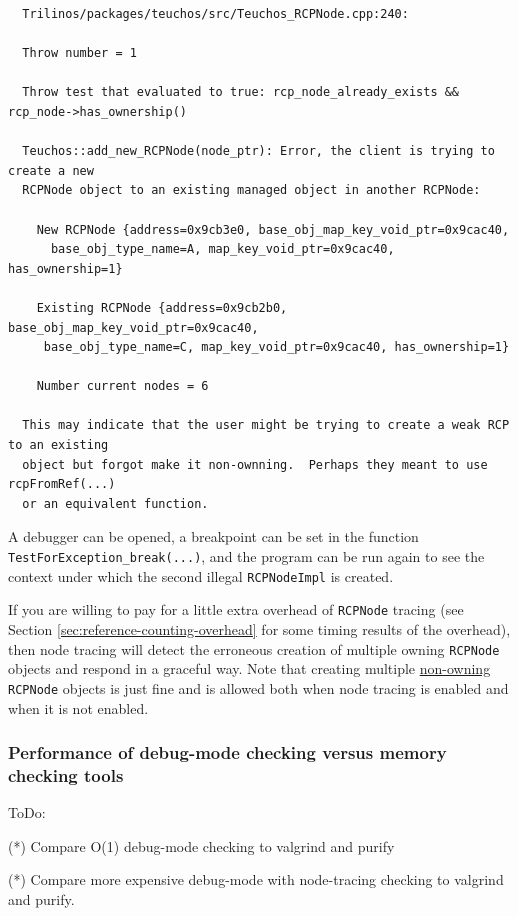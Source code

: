 \documentclass[pdf,ps2pdf,11pt]{SANDreport}
\begin{document}
{\small\begin{verbatim}
  Trilinos/packages/teuchos/src/Teuchos_RCPNode.cpp:240:
  
  Throw number = 1
  
  Throw test that evaluated to true: rcp_node_already_exists && rcp_node->has_ownership()
  
  Teuchos::add_new_RCPNode(node_ptr): Error, the client is trying to create a new
  RCPNode object to an existing managed object in another RCPNode:
  
    New RCPNode {address=0x9cb3e0, base_obj_map_key_void_ptr=0x9cac40,
      base_obj_type_name=A, map_key_void_ptr=0x9cac40, has_ownership=1}
  
    Existing RCPNode {address=0x9cb2b0, base_obj_map_key_void_ptr=0x9cac40,
     base_obj_type_name=C, map_key_void_ptr=0x9cac40, has_ownership=1}
  
    Number current nodes = 6
  
  This may indicate that the user might be trying to create a weak RCP to an existing
  object but forgot make it non-ownning.  Perhaps they meant to use rcpFromRef(...)
  or an equivalent function.
\end{verbatim}}

A debugger can be opened, a breakpoint can be set in the function
{}\texttt{TestForException\_break(...)}, and the program can be run
again to see the context under which the second illegal
{}\texttt{RCPNodeImpl} is created.

If you are willing to pay for a little extra overhead of
{}\texttt{RCPNode} tracing (see Section
{}\ref{sec:reference-counting-overhead} for some timing results of the
overhead), then node tracing will detect the erroneous creation of
multiple owning {}\texttt{RCPNode} objects and respond in a graceful
way.  Note that creating multiple {}\underline{non-owning}
{}\texttt{RCPNode} objects is just fine and is allowed both when node
tracing is enabled and when it is not enabled.


%
{}\subsubsection{Performance of debug-mode checking versus memory
checking tools}
%

ToDo:

(*) Compare O(1) debug-mode checking to valgrind and purify

(*) Compare more expensive debug-mode with node-tracing checking to
valgrind and purify.
\end{document}
